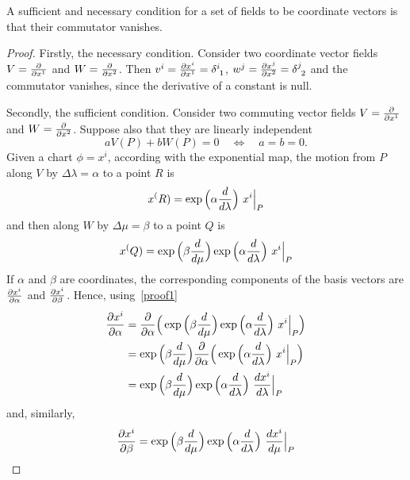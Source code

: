     A sufficient and necessary condition for a set of fields to be coordinate vectors is that their commutator vanishes. 
    \begin{proof}
    Firstly, the necessary condition. Consider two coordinate vector fields $V = \frac{\partial}{\partial x^1}$ and $W = \frac{\partial}{\partial x^2}$. Then $v^i = \pdv{x^i}{x^1} = \delta^i_{\phantom i 1}$, $w^j = \pdv{x^j}{x^2} = \delta^j_{\phantom j 2}$ and the commutator vanishes, since the derivative of a constant is null. 

    Secondly, the sufficient condition. Consider two commuting vector fields $V = \frac{\partial}{\partial x^1}$ and $W = \frac{\partial}{\partial x^2}$. Suppose also that they are linearly independent
    \begin{equation} \label{proof2}
        a V(P) + b W(P) = 0 \quad \iff \quad a = b = 0.
    \end{equation}
    Given a chart $\phi = x^i$, according with the exponential map, the motion from $P$ along $V$ by $\Delta \lambda = \alpha$ to a point $R$ is
    \begin{equation*}
        x^(R) = \exp \Big (\alpha \frac{d}{d\lambda} \Big) ~ x^i \Big\vert_P
    \end{equation*}
    and then along $W$ by $\Delta \mu = \beta$ to a point $Q$ is
    \begin{equation}\label{proof1}
        x^(Q) = \exp \Big (\beta \frac{d}{d\mu} \Big) \exp \Big (\alpha \frac{d}{d\lambda} \Big) ~ x^i \Big\vert_P
    \end{equation}
    If $\alpha$ and $\beta$ are coordinates, the corresponding components of the basis vectors are $\frac{\partial x^i}{\partial\alpha}$ and $\frac{\partial x^i}{\partial\beta}$.
    Hence, using~\eqref{proof1}
    \begin{equation*}
    \begin{aligned}
        \frac{\partial x^i}{\partial\alpha} & = \frac{\partial}{\partial\alpha} \Big ( \exp \Big( \beta \frac{d}{d\mu} \Big) \exp \Big( \alpha \frac{d}{d\lambda} \Big) ~ x^i \Big\vert_P \Big) \\ & = \exp \Big( \beta \frac{d}{d\mu} \Big) \frac{\partial}{\partial\alpha} \Big ( \exp \Big( \alpha \frac{d}{d\lambda} \Big) ~ x^i \Big\vert_P \Big) \\ & = \exp \Big( \beta \frac{d}{d\mu} \Big) \exp \Big( \alpha \frac{d}{d\lambda} \Big) ~ \frac{dx^i}{d\lambda} \Big\vert_P
    \end{aligned}
    \end{equation*}
    and, similarly, 
    \begin{equation*}
        \pdv{x^i}{\beta} = \exp \Big( \beta \dv{}{\mu} \Big) \exp \Big( \alpha \dv{}{\lambda} \Big) ~ \dv{x^i}{\mu} \Big\vert_P

\end{equation*}
\end{proof}
